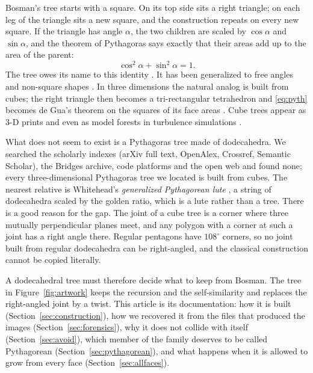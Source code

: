 \documentclass[12pt]{article}
\theoremstyle{plain}
\theoremstyle{remark}
\begin{document}
Bosman's tree starts with a square.  On its top side sits a right triangle;
on each leg of the triangle sits a new square, and the construction repeats on
every new square.  If the triangle has angle $\alpha$, the two children are
scaled by $\cos\alpha$ and $\sin\alpha$, and the theorem of Pythagoras says
exactly that their areas add up to the area of the parent:
\begin{equation}\label{eq:pyth}
  \cos^2\alpha+\sin^2\alpha = 1 .
\end{equation}
The tree owes its name to this identity \cite{Lauwerier1991}.  It has been
generalized to free angles and non-square shapes
\cite{Beck2014,Munz2019,Ruta2024}.  In three dimensions the natural analog
is built from cubes; the right triangle then becomes a tri-rectangular
tetrahedron and \eqref{eq:pyth} becomes de Gua's theorem on the squares of
its face areas \cite{ConantBeyer1974}.  Cube trees appear as 3-D prints and
even as model forests in turbulence simulations \cite{Schrottle2013}.

What does not seem to exist is a Pythagoras tree made of dodecahedra.  We
searched the scholarly indexes (arXiv full text, OpenAlex, Crossref, Semantic
Scholar), the Bridges archive, code platforms and the open web and found none;
every three-dimensional Pythagoras tree we located is built from cubes.  The
nearest relative is Whitehead's \emph{generalized Pythagorean lute}
\cite{Whitehead2022}, a string of dodecahedra scaled by the golden ratio, which
is a lute rather than a tree.  There is a good reason for the gap.  The joint
of a cube tree is a corner where three mutually perpendicular planes meet, and
any polygon with a corner at such a joint has a right angle there.  Regular
pentagons have $108^\circ$ corners, so no joint built from regular
dodecahedra can be right-angled, and the classical construction cannot be
copied literally.

A dodecahedral tree must therefore decide what to keep from Bosman.  The tree
in Figure~\ref{fig:artwork} keeps the recursion and the self-similarity and
replaces the right-angled joint by a twist.  This article is its
documentation: how it is built (Section~\ref{sec:construction}), how we
recovered it from the files that produced the images
(Section~\ref{sec:forensics}), why it does not collide with itself
(Section~\ref{sec:avoid}), which member of the family deserves to be called
Pythagorean (Section~\ref{sec:pythagorean}), and what happens when it is
allowed to grow from every face (Section~\ref{sec:allfaces}).
\end{document}
